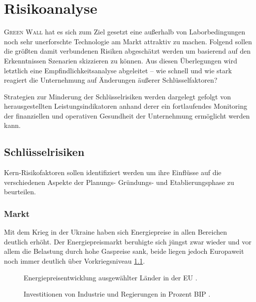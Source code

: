 \chapter{Risikoanalyse}

\textsc{Green Wall} hat es sich zum Ziel gesetzt eine außerhalb von Laborbedingungen noch sehr unerforschte Technologie am Markt attraktiv zu machen.
Folgend sollen die größten damit verbundenen Risiken abgeschätzt werden um basierend auf den Erkenntnissen Szenarien skizzieren zu können.
Aus diesen Überlegungen wird letztlich eine Empfindlichkeitsanalyse abgeleitet -- wie schnell und wie stark reagiert die Unternehmung auf Änderungen äußerer Schlüsselfaktoren?\par\medskip

Strategien zur Minderung der Schlüsselrisiken werden dargelegt gefolgt von herausgestellten Leistungsindikatoren anhand derer ein fortlaufendes Monitoring der finanziellen und operativen Gesundheit der Unternehmung ermöglicht werden kann.

\section{Schlüsselrisiken}

Kern-Risikofaktoren sollen identifiziert werden um ihre Einflüsse auf die verschiedenen Aspekte der Planungs- Gründungs- und Etablierungsphase zu beurteilen.

\subsection{Markt}

Mit dem Krieg in der Ukraine haben sich Energiepreise in allen Bereichen deutlich erhöht.
Der Energiepreismarkt beruhigte sich jüngst zwar wieder und vor allem die Belastung durch hohe Gaspreise sank, beide liegen jedoch Europaweit noch immer deutlich über Vorkriegsniveau \cref{fig:energiepreise}.

\begin{figure}[h]
    \centering
    
    \caption[Energiepreisentwicklung ausgewählter Länder in der EU]{Energiepreisentwicklung ausgewählter Länder in der EU \cite{Dataset.Eurostat.EnergyStatisticsNaturalGasAndElectricityPricesfrom2007Onwards.2024}.}\label{fig:energiepreise}
\end{figure}


\begin{figure}[h]
    \centering
    
    \caption[Investitionen von Industrie und Regierungen in Prozent BIP]{Investitionen von Industrie und Regierungen in Prozent BIP \cites{%
            Eurostat2024.InvPerBIP,%
            Statista2024.BIP.DE,%
            Statista2023.BIP.AT,%
            Statista2024.BIP.ES,%
            Statista2024.BIP.FR,%
            Statista2024.BIP.IT}.}\label{fig:inv bip}
\end{figure}

